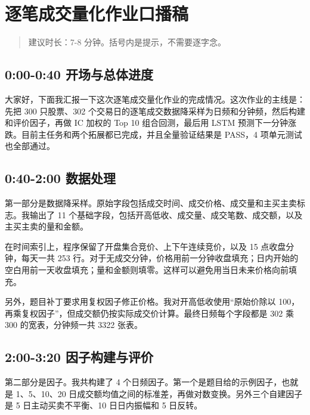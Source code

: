 \documentclass[
]{article}
\author{}
\date{\vspace{-2.5em}}
\begin{document}
\section{逐笔成交量化作业口播稿}\label{ux9010ux7b14ux6210ux4ea4ux91cfux5316ux4f5cux4e1aux53e3ux64adux7a3f}

\begin{quote}
建议时长：7-8 分钟。括号内是提示，不需要逐字念。
\end{quote}

\subsection{0:00-0:40
开场与总体进度}\label{ux5f00ux573aux4e0eux603bux4f53ux8fdbux5ea6}

大家好，下面我汇报一下这次逐笔成交量化作业的完成情况。这次作业的主线是：先把
300 只股票、302
个交易日的逐笔成交数据降采样为日频和分钟频，然后构建和评价因子，再做 IC
加权的 Top 10 组合回测，最后用 LSTM
预测下一分钟涨跌。目前主任务和两个拓展都已完成，并且全量验证结果是
PASS，4 项单元测试也全部通过。

\subsection{0:40-2:00 数据处理}\label{ux6570ux636eux5904ux7406}

第一部分是数据降采样。原始字段包括成交时间、成交价格、成交量和主买主卖标志。我输出了
11
个基础字段，包括开高低收、成交量、成交笔数、成交额，以及主买主卖的量和金额。

在时间索引上，程序保留了开盘集合竞价、上下午连续竞价，以及 15
点收盘分钟，每天一共 253
行。对于无成交分钟，价格用前一分钟收盘填充；日内开始的空白用前一天收盘填充；量和金额则填零。这样可以避免用当日未来价格向前填充。

另外，题目补丁要求用复权因子修正价格。我对开高低收使用``原始价除以
100，再乘复权因子''，但成交额仍按实际成交价计算。最终日频每个字段都是
302 乘 300 的宽表，分钟频一共 3322 张表。

\subsection{2:00-3:20
因子构建与评价}\label{ux56e0ux5b50ux6784ux5efaux4e0eux8bc4ux4ef7}

第二部分是因子。我共构建了 4
个日频因子。第一个是题目给的示例因子，也就是 1、5、10、20
日成交额均值之间的标准差，再做对数变换。另外三个自建因子是 5
日主动买卖不平衡、10 日日内振幅和 5 日反转。
\end{document}
